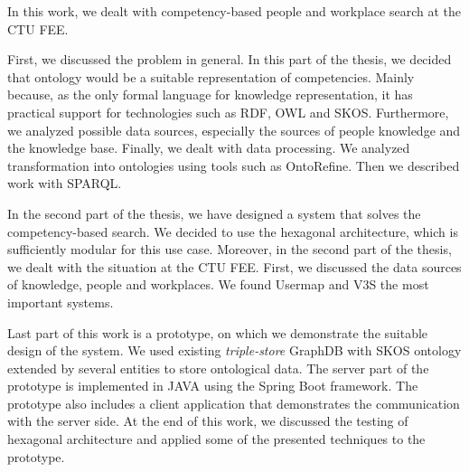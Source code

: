 \begin{abstract-english}
         In this work, we dealt with competency-based people and workplace search at the CTU FEE.\par
First, we discussed the problem in general. In this part of the thesis, we decided that ontology would be a suitable representation of competencies. Mainly because, as the only formal language for knowledge representation, it has practical support for technologies such as RDF, OWL and SKOS. Furthermore, we analyzed possible data sources, especially the sources of people knowledge and the knowledge base. Finally, we dealt with data processing. We analyzed transformation into ontologies using tools such as OntoRefine. Then we described work with SPARQL.\par
In the second part of the thesis, we have designed a system that solves the competency-based search. We decided to use the hexagonal architecture, which is sufficiently modular for this use case. Moreover, in the second part of the thesis, we dealt with the situation at the CTU FEE. First, we discussed the data sources of knowledge, people and workplaces. We found Usermap and V3S the most important systems.\par
Last part of this work is a prototype, on which we demonstrate the suitable design of the system. We used existing \textit{triple-store} GraphDB with SKOS ontology extended by several entities to store ontological data. The server part of the prototype is implemented in JAVA using the Spring Boot framework. The prototype also includes a client application that demonstrates the communication with the server side. At the end of this work, we discussed the testing of hexagonal architecture and applied some of the presented techniques to the prototype.
\newpage
\end{abstract-english}


